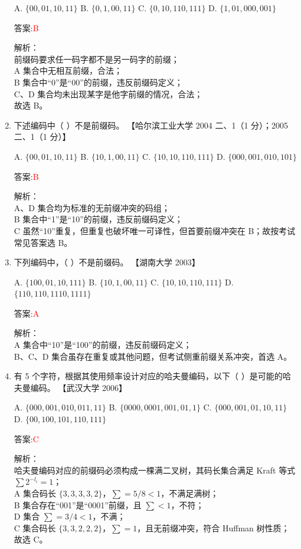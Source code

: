 \documentclass[lang=cn,newtx,10pt,scheme=chinese]{../../../elegantbook}
\begin{document}
\begin{enumerate}
    A. $\{00, 01, 10, 11\}$  
    B. $\{0, 1, 00, 11\}$  
    C. $\{0, 10, 110, 111\}$  
    D. $\{1, 01, 000, 001\}$  

    答案:\textcolor{red}{B}

    解析：\\
    前缀码要求任一码字都不是另一码字的前缀；\\
    A 集合中无相互前缀，合法；\\
    B 集合中“0”是“00”的前缀，违反前缀码定义；\\
    C、D 集合均未出现某字是他字前缀的情况，合法；\\
    故选 B。

\item 下述编码中（  ）不是前缀码。  
    【哈尔滨工业大学 2004 二、1（1 分）；2005 二、1（1 分）】

    A. $\{00, 01, 10, 11\}$  
    B. $\{10, 1, 00, 11\}$  
    C. $\{10, 10, 110, 111\}$  
    D. $\{000, 001, 010, 101\}$  

    答案:\textcolor{red}{B}

    解析：\\
    A、D 集合均为标准的无前缀冲突的码组；\\
    B 集合中“1”是“10”的前缀，违反前缀码定义；\\
    C 虽然“10”重复，但重复也破坏唯一可译性，但首要前缀冲突在 B；故按考试常见答案选 B。

\item 下列编码中，（  ）不是前缀码。  
    【湖南大学 2003】

    A. $\{100, 01, 10, 111\}$  
    B. $\{10, 1, 00, 11\}$  
    C. $\{10, 10, 110, 111\}$  
    D. $\{110, 110, 1110, 1111\}$  

    答案:\textcolor{red}{A}

    解析：\\
    A 集合中“10”是“100”的前缀，违反前缀码定义；\\
    B、C、D 集合虽存在重复或其他问题，但考试侧重前缀关系冲突，首选 A。

\item 有 5 个字符，根据其使用频率设计对应的哈夫曼编码，以下（  ）是可能的哈夫曼编码。  
    【武汉大学 2006】

    A. $\{000, 001, 010, 011, 11\}$  
    B. $\{0000, 0001, 001, 01, 1\}$  
    C. $\{000, 001, 01, 10, 11\}$  
    D. $\{00, 100, 101, 110, 111\}$  

    答案:\textcolor{red}{C}

    解析：\\
    哈夫曼编码对应的前缀码必须构成一棵满二叉树，其码长集合满足 Kraft 等式 $\sum 2^{-l_i}=1$；\\
    A 集合码长 $\{3,3,3,3,2\}$，$\sum =5/8<1$，不满足满树；\\
    B 集合存在“001”是“0001”前缀，且 $\sum<1$，不符；\\
    D 集合 $\sum=3/4<1$，不满；\\
    C 集合码长 $\{3,3,2,2,2\}$，$\sum=1$，且无前缀冲突，符合 Huffman 树性质；故选 C。


\end{enumerate}
\end{document}
